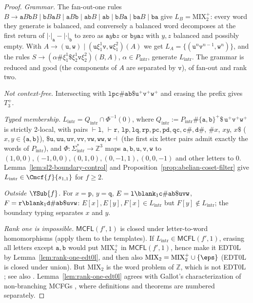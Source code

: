 \begin{proof}
\emph{Grammar.}  The fan-out-one rules
$B\to\mathtt aB\mathtt bB\mid\mathtt bB\mathtt aB\mid\mathtt aB\mathtt b\mid
\mathtt{ab}B\mid\mathtt{ab}\mid\mathtt bB\mathtt a\mid\mathtt{ba}B\mid\mathtt{ba}$
give $L_B=\mathrm{MIX}_2^+$: every word they generate is balanced, and conversely a
balanced word decomposes at the first return of $|\cdot|_{\mathtt a}-|\cdot|_{\mathtt b}$
to zero as $\mathtt ay\mathtt bz$ or $\mathtt by\mathtt az$ with $y,z$ balanced and
possibly empty.  With $A\to(\mathtt u,\mathtt w)\mid(\mathtt u\xi_1^1\mathtt v,
\mathtt w\xi_1^2)(A)$ we get $L_A=\{(\mathtt u^n\mathtt v^{n-1},\mathtt w^n)\}$, and
the rules $S\to(\alpha\mathtt\#\xi_1^1\mathtt\$\xi_2^1\mathtt v\xi_2^2)(B,A)$,
$\alpha\in P_{\mathrm{intr}}$, generate $L_{\mathrm{intr}}$.  The grammar is reduced and
good (the components of $A$ are separated by $\mathtt v$), of fan-out and rank two.

\emph{Not context-free.}  Intersecting with $\mathtt{lpc\#ab\$}\mathtt u^+\mathtt v^+
\mathtt w^+$ and erasing the prefix gives $T_3^+$.

\emph{Typed membership.}  $L_{\mathrm{intr}}=Q_{\mathrm{intr}}\cap\Phi^{-1}(0)$, where
$Q_{\mathrm{intr}}:=P_{\mathrm{intr}}\mathtt\#\{\mathtt a,\mathtt b\}^+\mathtt\$\,
\mathtt u^+\mathtt v^+\mathtt w^+$ is strictly 2-local, with pairs
$\vdash\mathtt l$, $\vdash\mathtt r$, $\mathtt{lp},\mathtt{lq},\mathtt{rp},\mathtt{pc},
\mathtt{pd},\mathtt{qc},\mathtt{c\#},\mathtt{d\#}$, $\mathtt{\#}x$, $xy$, $x\mathtt\$$
($x,y\in\{\mathtt a,\mathtt b\}$), $\mathtt{\$u},\mathtt{uu},\mathtt{uv},\mathtt{vv},
\mathtt{vw},\mathtt{ww},\mathtt w\dashv$ (the first six letter pairs admit exactly the
words of $P_{\mathrm{intr}}$), and $\Phi:\Sigma_{\mathrm{intr}}^*\to\mathbb Z^3$ maps
$\mathtt a,\mathtt b,\mathtt u,\mathtt v,\mathtt w$ to $(1,0,0),(-1,0,0),(0,1,0),
(0,-1,1),(0,0,-1)$ and other letters to $0$.  Lemma~\ref{lem:sl2-boundary-control} and
Proposition~\ref{prop:abelian-coset-filter} give
$L_{\mathrm{intr}}\in\Cmcf{f}{s_{1,1}}$ for $f\ge2$.

\emph{Outside $\YSub{f}$.}  For $x=\mathtt p$, $y=\mathtt q$,
$E=\mathtt l\blank_1\mathtt{c\#ab\$uvw}$, $F=\mathtt r\blank_1\mathtt{d\#ab\$uvw}$:
$E[x],E[y],F[x]\in L_{\mathrm{intr}}$ but $F[y]\notin L_{\mathrm{intr}}$; the boundary
typing separates $x$ and $y$.

\emph{Rank one is impossible.}  $\mathsf{MCFL}(f',1)$ is closed under letter-to-word
homomorphisms (apply them to the templates).  If $L_{\mathrm{intr}}\in\mathsf{MCFL}(f',1)$,
erasing all letters except $\mathtt a,\mathtt b$ would put $\mathrm{MIX}_2^+$ in
$\mathsf{MCFL}(f',1)$, hence make it EDT0L by Lemma~\ref{lem:rank-one-edt0l}, and then
also $\mathrm{MIX}_2=\mathrm{MIX}_2^+\cup\{\eps\}$ (EDT0L is closed under union).  But
$\mathrm{MIX}_2$ is the word problem of $\mathbb Z$, which is not EDT0L
\cite{BishopEtAl2026EDT0L}; see also \cite[Corollary~32]{Gallot2021}.
Lemma~\ref{lem:rank-one-edt0l} agrees with Gallot's characterization of
non-branching MCFGs \cite[Definition~38 and Theorems~28--29]{Gallot2021}, where
definitions and theorems are numbered separately.
\end{proof}


